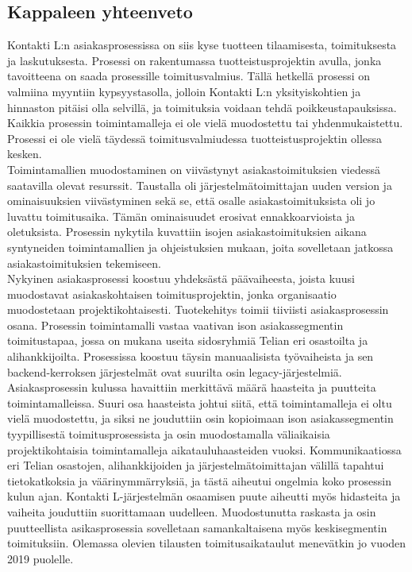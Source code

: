 \documentclass[finnish,12pt,a4paper,pdftex]{article}
\begin{document}
\subsection{Kappaleen yhteenveto}

Kontakti L:n asiakasprosessissa on siis kyse tuotteen tilaamisesta, toimituksesta ja laskutuksesta. Prosessi on rakentumassa tuotteistusprojektin avulla, jonka tavoitteena on saada prosessille toimitusvalmius. Tällä hetkellä prosessi on valmiina myyntiin kypsyystasolla, jolloin Kontakti L:n yksityiskohtien ja hinnaston pitäisi olla selvillä, ja toimituksia voidaan tehdä poikkeustapauksissa. Kaikkia prosessin toimintamalleja ei ole vielä muodostettu tai yhdenmukaistettu. Prosessi ei ole vielä täydessä toimitusvalmiudessa tuotteistusprojektin ollessa kesken.\\

\noindent Toimintamallien muodostaminen on viivästynyt asiakastoimituksien viedessä saatavilla olevat resurssit. Taustalla oli järjestelmätoimittajan uuden version ja ominaisuuksien viivästyminen sekä se, että osalle asiakastoimituksista oli jo luvattu toimitusaika. Tämän ominaisuudet erosivat ennakkoarvioista ja oletuksista. Prosessin nykytila kuvattiin isojen asiakastoimituksien aikana syntyneiden toimintamallien ja ohjeistuksien mukaan, joita sovelletaan jatkossa asiakastoimituksien tekemiseen.\\

Nykyinen asiakasprosessi koostuu yhdeksästä päävaiheesta, joista kuusi muodostavat asiakaskohtaisen toimitusprojektin, jonka organisaatio muodostetaan projektikohtaisesti. Tuotekehitys toimii tiiviisti asiakasprosessin osana. Prosessin toimintamalli vastaa vaativan ison asiakassegmentin toimitustapaa, jossa on mukana useita sidosryhmiä Telian eri osastoilta ja alihankkijoilta. Prosessissa koostuu täysin manuaalisista työvaiheista ja sen backend-kerroksen järjestelmät ovat suurilta osin legacy-järjestelmiä. \\
\noindent Asiakasprosessin kulussa havaittiin merkittävä määrä haasteita ja puutteita toimintamalleissa. Suuri osa haasteista johtui siitä, että toimintamalleja ei oltu vielä muodostettu, ja siksi ne jouduttiin osin kopioimaan ison asiakassegmentin tyypillisestä toimitusprosessista ja osin muodostamalla väliaikaisia projektikohtaisia toimintamalleja aikatauluhaasteiden vuoksi. Kommunikaatiossa eri Telian osastojen, alihankkijoiden ja järjestelmätoimittajan välillä tapahtui tietokatkoksia ja väärinymmärryksiä, ja tästä aiheutui ongelmia koko prosessin kulun ajan. Kontakti L-järjestelmän osaamisen puute aiheutti myös hidasteita ja vaiheita jouduttiin suorittamaan uudelleen. Muodostunutta raskasta ja osin puutteellista asikasprosessia sovelletaan samankaltaisena myös keskisegmentin toimituksiin. Olemassa olevien tilausten toimitusaikataulut menevätkin jo vuoden 2019 puolelle.\\
\end{document}
